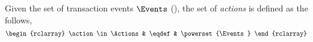 

\begin{defn}[Actions]
Given the set of transaction events \( \Events \) (), the set of \emph{actions} is defined as the follows,
\[
    \begin{rclarray}
        \action \in \Actions & \eqdef & \powerset{\Events}
    \end{rclarray}
\]
\end{defn}

